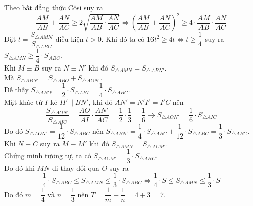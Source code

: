 \begin{ex}
{			Theo bất đẳng thức Côsi suy ra 
			$$\dfrac{AM}{AB} + \dfrac{AN}{AC}\geq 2\sqrt{\dfrac{AM}{AB}\cdot \dfrac{AN}{AC}}\Leftrightarrow \left(\dfrac{AM}{AB} + \dfrac{AN}{AC}\right)^2\geq 4\cdot \dfrac{AM}{AB}\cdot \dfrac{AN}{AC}$$
			Đặt $t = \dfrac{S_{\triangle AMN}}{S_{\triangle ABC}}$ điều kiện $t > 0$. Khi đó ta có  $16t^2\geq 4t\Leftrightarrow t\geq\dfrac{1}{4}$ suy ra $S_{\triangle AMN}\geq \dfrac{1}{4}\cdot S_{ABC}$.\\
			Khi $M\equiv B$ suy ra $N\equiv N'$ khi đó $S_{\triangle AMN} =  S_{\triangle ABN'}$.\\
			Mà $S_{\triangle ABN'} = S_{\triangle ABO}+ S_{\triangle AON'}$.\\
			Dễ thấy $S_{\triangle ABO} = \dfrac{1}{2}\cdot S_{\triangle ABI} = \dfrac{1}{4}\cdot S_{\triangle ABC}$.\\
			Mặt khác từ $I$ kẻ $II'\parallel BN'$, khi đó $AN' = N'I' = I'C$ nên
			$$\dfrac{S_{\triangle AON'}}{S_{\triangle AIC}} = \dfrac{AO}{AI}\cdot\dfrac{AN'}{AC} = \dfrac{1}{2}\cdot\dfrac{1}{3} = \dfrac{1}{6}\Rrightarrow S_{\triangle AON'} = \dfrac{1}{6}\cdot S_{\triangle AIC}$$
			Do đó $S_{\triangle AON'} = \dfrac{1}{12}\cdot S_{\triangle ABC}$ nên $S_{\triangle ABN'} = \dfrac{1}{4}\cdot S_{\triangle ABC} + \dfrac{1}{12}\cdot S_{\triangle ABC} = \dfrac{1}{3}\cdot S_{\triangle ABC}$.\\
			Khi $N\equiv C$ suy ra $M\equiv M'$ khi đó $S_{\triangle AMN} =  S_{\triangle ACM'}$.\\
			Chứng minh tương tự, ta có  $S_{\triangle ACM'} = \dfrac{1}{3}\cdot S_{\triangle ABC}$.\\
			Do đó khi $MN$ đi thay đổi qua $O$ suy ra 
			$$\dfrac{1}{4}\cdot S_{\triangle ABC}\leq  S_{\triangle AMN}\leq  \dfrac{1}{3}\cdot S_{\triangle ABC}\Leftrightarrow \dfrac{1}{4}\cdot S\leq S_{\triangle AMN} \leq  \dfrac{1}{3}\cdot S$$
			Do đó $m = \dfrac{1}{4}$ và $n = \dfrac{1}{3}$ nên $T = \dfrac{1}{m} + \dfrac{1}{n} = 4 + 3 = 7$.
		}
	\end{ex}
	